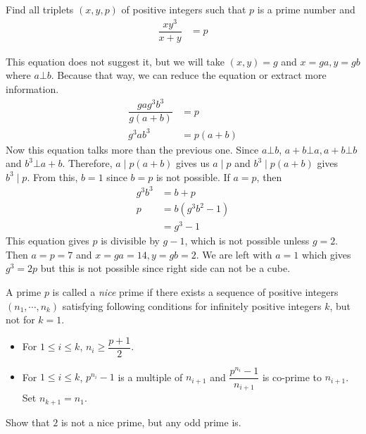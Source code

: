 \documentclass[problems.tex]{subfile}
\begin{document}
	\begin{problem}
		Find all triplets $(x, y, p)$ of positive integers such that $p$ is a prime number and
			\begin{align*}
				\dfrac{xy^3}{x+y} & = p
			\end{align*}
	\end{problem}

	\begin{solution}
		This equation does not suggest it, but we will take $(x,y)=g$ and $x=ga,y=gb$ where $a\bot b$. Because that way, we can reduce the equation or extract more information.
			\begin{align*}
				\dfrac{gag^3b^3}{g(a+b)} & = p\\
				g^3ab^3 & = p(a+b)
			\end{align*}
		Now this equation talks more than the previous one. Since $a\bot b$, $a+b\bot a,a+b\bot b$ and $b^3\bot a+b$. Therefore, $a\mid p(a+b)$ gives us $a\mid p$ and $b^3\mid p(a+b)$ gives $b^3\mid p$. From this, $b=1$ since $b=p$ is not possible. If $a=p$, then
			\begin{align*}
				g^3b^3 & = b+p\\
				p & = b(g^3b^2-1)\\
				  & = g^3-1
			\end{align*}
		This equation gives $p$ is divisible by $g-1$, which is not possible unless $g=2$. Then $a=p=7$ and $x=ga=14,y=gb=2$. We are left with $a=1$ which gives $g^3=2p$ but this is not possible since right side can not be a cube.
	\end{solution}

	\begin{problem}[Korea $2010$]
		A prime $p$ is called a \textit{nice} prime if there exists a sequence of positive integers $(n_1,\cdots,n_k)$ satisfying following conditions for infinitely positive integers $k$, but not for $k=1$.
			\begin{itemize}
				\item For $1\leq i\leq k$, $n_i\geq\dfrac{p+1}{2}$.
				\item For $1\leq i\leq k$, $p^{n_i}-1$ is a multiple of $n_{i+1}$ and $\dfrac{p^{n_i}-1}{n_{i+1}}$ is co-prime to $n_{i+1}$. Set $n_{k+1} = n_1$.
			\end{itemize}
		Show that $2$ is not a nice prime, but any odd prime is.
	\end{problem}
\end{document}
